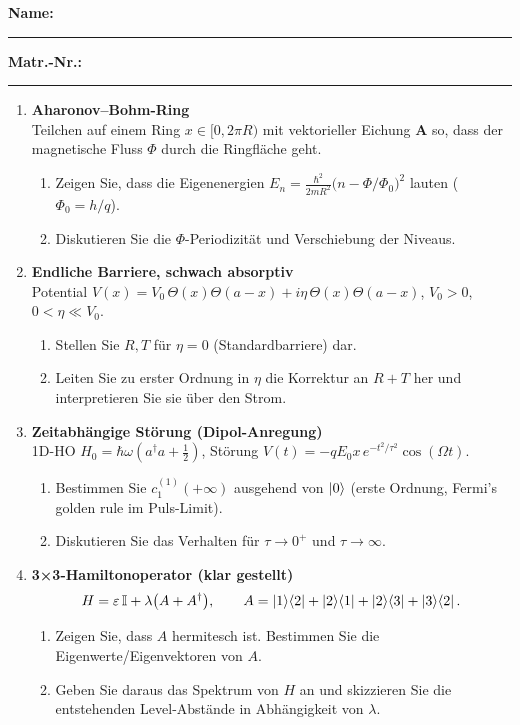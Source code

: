 \documentclass[11pt,a4paper]{article}
\begin{document}
\noindent\textbf{Name:} \rule{0.6\linewidth}{0.4pt}\hfill\textbf{Matr.-Nr.:} \rule{0.25\linewidth}{0.4pt}
\vspace{1em}
\begin{enumerate}

\item \textbf{Aharonov–Bohm-Ring}\\
Teilchen auf einem Ring \(x\in[0,2\pi R)\) mit vektorieller Eichung \(\mathbf A\) so, dass der magnetische Fluss \(\Phi\) durch die Ringfläche geht.
\begin{enumerate}
  \item Zeigen Sie, dass die Eigenenergien \(E_n=\frac{\hbar^2}{2mR^2}\bigl(n-\Phi/\Phi_0\bigr)^2\) lauten (\(\Phi_0=h/q\)).
  \item Diskutieren Sie die \(\Phi\)-Periodizität und Verschiebung der Niveaus.
\end{enumerate}

\item \textbf{Endliche Barriere, schwach absorptiv}\\
Potential \(V(x)=V_0\,\Theta(x)\Theta(a-x)+ i\eta\,\Theta(x)\Theta(a-x)\), \(V_0>0\), \(0<\eta\ll V_0\).
\begin{enumerate}
  \item Stellen Sie \(R,T\) für \(\eta=0\) (Standardbarriere) dar.
  \item Leiten Sie zu erster Ordnung in \(\eta\) die Korrektur an \(R+T\) her und interpretieren Sie sie über den Strom.
\end{enumerate}

\item \textbf{Zeitabhängige Störung (Dipol-Anregung)}\\
1D-HO \(H_0=\hbar\omega(a^\dagger a+\tfrac12)\), Störung \(V(t)=-q E_0 x\, e^{-t^2/\tau^2}\cos(\Omega t)\).
\begin{enumerate}
  \item Bestimmen Sie \(c_{1}^{(1)}(+\infty)\) ausgehend von \(\ket{0}\) (erste Ordnung, Fermi’s golden rule im Puls-Limit).
  \item Diskutieren Sie das Verhalten für \(\tau\to 0^+\) und \(\tau\to\infty\).
\end{enumerate}

\item \textbf{3×3-Hamiltonoperator (klar gestellt)}\\
\[
H=\varepsilon\,\mathbb I+\lambda\bigl(A+A^\dagger\bigr),\qquad
A=\ket1\!\bra2+\ket2\!\bra1+\ket2\!\bra3+\ket3\!\bra2.
\]
\begin{enumerate}
  \item Zeigen Sie, dass \(A\) hermitesch ist. Bestimmen Sie die Eigenwerte/Eigenvektoren von \(A\).
  \item Geben Sie daraus das Spektrum von \(H\) an und skizzieren Sie die entstehenden Level-Abstände in Abhängigkeit von \(\lambda\).
\end{enumerate}


\end{enumerate}
\end{document}
